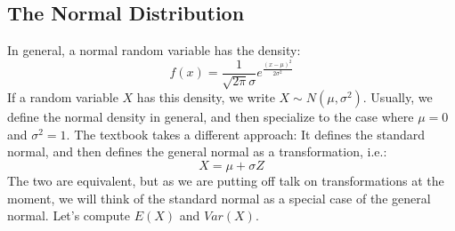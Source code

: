 \documentclass[12pt]{article} %
\begin{document}
\subsection{The Normal Distribution}
In general, a normal random variable has the density:
$$f(x) = \frac1{\sqrt{2\pi}\sigma} e^{\frac{\left(x-\mu\right)^2}{2\sigma^2}}$$
If a random variable $X$ has this density, we write $X\sim N(\mu,\sigma^2)$. Usually, we define the normal density in general, and then specialize to the case where $\mu = 0$ and $\sigma^2=1$. The textbook takes a different approach: It defines the standard normal, and then defines the general normal as a transformation, i.e.:
$$X = \mu + \sigma Z$$
The two are equivalent, but as we are putting off talk on transformations at the moment, we will think of the standard normal as a special case of the general normal. Let's compute $E(X)$ and $Var(X)$.
\end{document}
